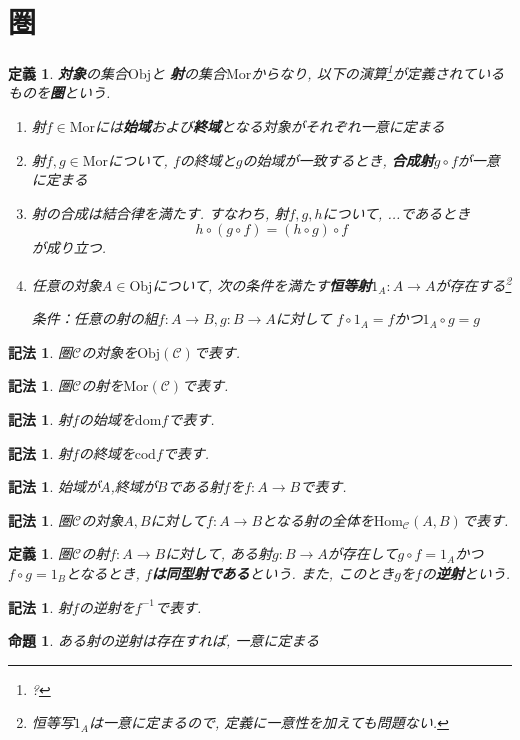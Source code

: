 \documentclass[dvipdfmx]{jsbook}
\theoremstyle{plain}
\newtheorem{Def}[thm]{定義}
\newtheorem{Notation}[thm]{記法}
\newtheorem{Prop}[thm]{命題}
\begin{document}
\section{圏}
\begin{Def}
{\bf 対象}の集合$\mathrm{Obj}$と
{\bf 射}の集合$\mathrm{Mor}$からなり, 以下の演算\footnote{?}が定義されているものを{\bf 圏}という.
\begin{enumerate}
\item 射$f\in\mathrm{Mor}$には{\bf 始域}および{\bf 終域}となる対象がそれぞれ一意に定まる
\item 射$f,g\in\mathrm{Mor}$について,
$f$の終域と$g$の始域が一致するとき,
{\bf 合成射}$g\circ f$が一意に定まる
\item 射の合成は結合律を満たす. すなわち, 射$f,g,h$について, ...であるとき
\[
h\circ(g\circ f)=(h\circ g)\circ f
\]
が成り立つ.
\item 任意の対象$A\in\mathrm{Obj}$について,
次の条件を満たす{\bf 恒等射}$1_{A}:A\rightarrow A$が存在する\footnote{恒等写$1_{A}$は一意に定まるので, 定義に一意性を加えても問題ない.}

条件：任意の射の組$f:A\rightarrow B, g:B\rightarrow A$に対して
$f\circ 1_A=f$かつ$1_A\circ g=g$
\end{enumerate}
\end{Def}
\begin{Notation}
圏$\mathscr{C}$の対象を$\mathrm{Obj}(\mathscr{C})$で表す.
\end{Notation}
\begin{Notation}
圏$\mathscr{C}$の射を$\mathrm{Mor}(\mathscr{C})$で表す.
\end{Notation}
\begin{Notation}
射$f$の始域を$\mathrm{dom}f$で表す.
\end{Notation}
\begin{Notation}
射$f$の終域を$\mathrm{cod}f$で表す.
\end{Notation}
\begin{Notation}
始域が$A$,終域が$B$である射$f$を$f:A\rightarrow B$で表す.
\end{Notation}
\begin{Notation}
圏$\mathscr{C}$の対象$A,B$に対して$f:A\rightarrow B$となる射の全体を$\mathrm{Hom}_{\mathscr{C}}(A,B)$で表す.
\end{Notation}
\begin{Def}
圏$\mathscr{C}$の射$f:A\rightarrow B$に対して,
ある射$g:B\rightarrow A$が存在して$g\circ f=1_A$かつ$f\circ g=1_B$となるとき,
{\bf $f$は同型射である}という. また, このとき$g$を$f$の{\bf 逆射}という.
\end{Def}
\begin{Notation}
射$f$の逆射を$f^{-1}$で表す.
\end{Notation}
\begin{Prop}
ある射の逆射は存在すれば, 一意に定まる
\end{Prop}
\end{document}
